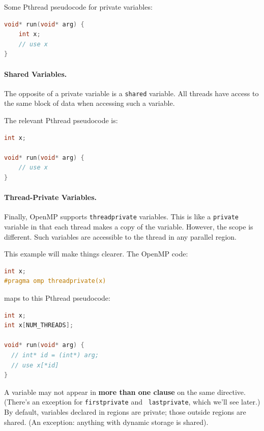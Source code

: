 \documentclass[a4paper]{report}
\begin{document}
Some Pthread pseudocode for private variables:

  \begin{lstlisting}[language=C]
void* run(void* arg) {
    int x;
    // use x
}
  \end{lstlisting}

\paragraph{Shared Variables.} The opposite of a private variable
is a {\tt shared} variable. All threads have access to the same block
of data when accessing such a variable.

The relevant Pthread pseudocode is:
  \begin{lstlisting}[language=C]
int x;

void* run(void* arg) {
    // use x
}
  \end{lstlisting}

\paragraph{Thread-Private Variables.} Finally, OpenMP supports 
{\tt threadprivate} variables. This is like a {\tt private} variable
in that each thread makes a copy of the variable. However, the scope 
is different. Such variables are accessible to the thread in any parallel region.

This example will make things clearer. The OpenMP code:
  \begin{lstlisting}[language=C]
int x;
#pragma omp threadprivate(x)
  \end{lstlisting}
  maps to this Pthread pseudocode:
  \begin{lstlisting}[language=C]
int x;
int x[NUM_THREADS];

void* run(void* arg) {
  // int* id = (int*) arg;
  // use x[*id]
}
  \end{lstlisting}

A variable may not appear in {\bf more than one clause} on the same
directive. (There's an exception for {\tt firstprivate} and {\tt
  lastprivate}, which we'll see later.) By default, variables
declared in regions are private; those outside regions are
shared. (An exception: anything with dynamic storage is
shared).
\end{document}
